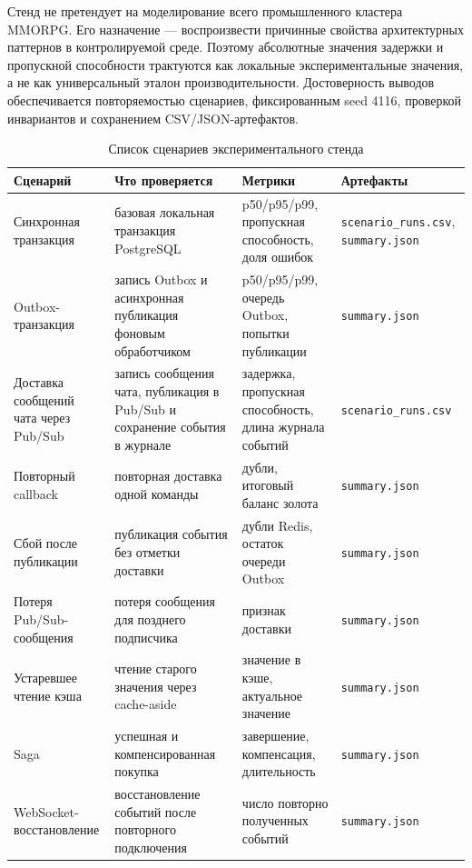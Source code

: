 \documentclass[a4paper,14pt]{extarticle}
\makeatletter
\newcommand{\tablefont}{\scriptsize}
\newcommand{\cellstack}[1]{\begin{tabular}[t]{@{}l@{}}#1\end{tabular}}
\renewcommand{\toprule}{\hline}
\renewcommand{\midrule}{\hline}
\renewcommand{\bottomrule}{\hline}
\numberwithin{figure}{section}
\numberwithin{table}{section}
\makeatother
\begin{document}
Стенд не претендует на моделирование всего промышленного кластера MMORPG. Его назначение --- воспроизвести причинные свойства архитектурных паттернов в контролируемой среде. Поэтому абсолютные значения задержки и пропускной способности трактуются как локальные экспериментальные значения, а не как универсальный эталон производительности. Достоверность выводов обеспечивается повторяемостью сценариев, фиксированным seed 4116, проверкой инвариантов и сохранением CSV/JSON-артефактов.

\begin{table}[H]
\centering
\caption{Список сценариев экспериментального стенда}
\label{tab:experiment-design}
\tablefont
\setlength{\tabcolsep}{1.5pt}
\renewcommand{\arraystretch}{1.12}
\begin{tabular}{|L{2.6cm}|L{4.5cm}|L{3.6cm}|L{4.0cm}|}
\toprule
Сценарий & Что проверяется & Метрики & Артефакты \\
\midrule
Синхронная транзакция & базовая локальная транзакция PostgreSQL & p50/p95/p99, пропускная способность, доля ошибок & \texttt{scenario\_runs.csv}, \texttt{summary.json} \\
\hline
Outbox-транзакция & запись Outbox и асинхронная публикация фоновым обработчиком & p50/p95/p99, очередь Outbox, попытки публикации & \texttt{summary.json} \\
\hline
\cellstack{Доставка сообщений\\чата через Pub/Sub} & запись сообщения чата, публикация в Pub/Sub и сохранение события в журнале & задержка, пропускная способность, длина журнала событий & \texttt{scenario\_runs.csv} \\
\hline
Повторный callback & повторная доставка одной команды & дубли, итоговый баланс золота & \texttt{summary.json} \\
\hline
Сбой после публикации & публикация события без отметки доставки & дубли Redis, остаток очереди Outbox & \texttt{summary.json} \\
\hline
Потеря Pub/Sub-сообщения & потеря сообщения для позднего подписчика & признак доставки & \texttt{summary.json} \\
\hline
Устаревшее чтение кэша & чтение старого значения через cache-aside & значение в кэше, актуальное значение & \texttt{summary.json} \\
\hline
Saga & успешная и компенсированная покупка & завершение, компенсация, длительность & \texttt{summary.json} \\
\hline
WebSocket-восстановление & восстановление событий после повторного подключения & число повторно полученных событий & \texttt{summary.json} \\
\bottomrule
\end{tabular}
\end{table}
\end{document}
